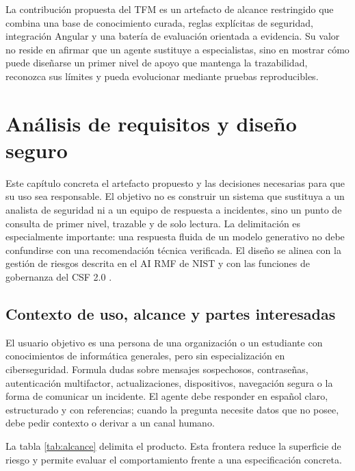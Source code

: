\documentclass[12pt,twoside,titlepage]{book}
\begin{document}
La contribución propuesta del TFM es un artefacto de alcance restringido que
combina una base de conocimiento curada, reglas explícitas de seguridad,
integración Angular y una batería de evaluación orientada a evidencia. Su valor
no reside en afirmar que un agente sustituye a especialistas, sino en mostrar
cómo puede diseñarse un primer nivel de apoyo que mantenga la trazabilidad,
reconozca sus límites y pueda evolucionar mediante pruebas reproducibles.




\chapter{An\'alisis de requisitos y dise\~no seguro}
\label{chap:diseno}

Este cap\'itulo concreta el artefacto propuesto y las decisiones necesarias para que su uso sea responsable. El objetivo no es construir un sistema que sustituya a un analista de seguridad ni a un equipo de respuesta a incidentes, sino un punto de consulta de primer nivel, trazable y de solo lectura. La delimitaci\'on es especialmente importante: una respuesta fluida de un modelo generativo no debe confundirse con una recomendaci\'on t\'ecnica verificada. El dise\~no se alinea con la gesti\'on de riesgos descrita en el AI RMF de NIST \cite{nistAiRmf2023,nistGenAi2024} y con las funciones de gobernanza del CSF 2.0 \cite{nistCsf2024}.

\section{Contexto de uso, alcance y partes interesadas}

El usuario objetivo es una persona de una organizaci\'on o un estudiante con conocimientos de inform\'atica generales, pero sin especializaci\'on en ciberseguridad. Formula dudas sobre mensajes sospechosos, contrase\~nas, autenticaci\'on multifactor, actualizaciones, dispositivos, navegaci\'on segura o la forma de comunicar un incidente. El agente debe responder en espa\~nol claro, estructurado y con referencias; cuando la pregunta necesite datos que no posee, debe pedir contexto o derivar a un canal humano.

La tabla \ref{tab:alcance} delimita el producto. Esta frontera reduce la superficie de riesgo y permite evaluar el comportamiento frente a una especificaci\'on concreta.
\end{document}

